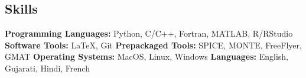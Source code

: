 \documentclass[margin,line]{res}
\newlength{\myitemspacing}
\begin{document}
\begin{resume}
\section{\sc Skills}
{\bf Programming Languages:} Python, C/C++, Fortran, MATLAB, R/RStudio
\vspace{\myitemspacing}\newline
{\bf Software Tools:} \LaTeX, Git
\vspace{\myitemspacing}\newline
{\bf Prepackaged Tools:} SPICE, MONTE, FreeFlyer, GMAT
\vspace{\myitemspacing}\newline
{\bf Operating Systems:} MacOS, Linux, Windows
\vspace{\myitemspacing}\newline
{\bf Languages:} English, Gujarati, Hindi, French


\end{resume}
\end{document}
